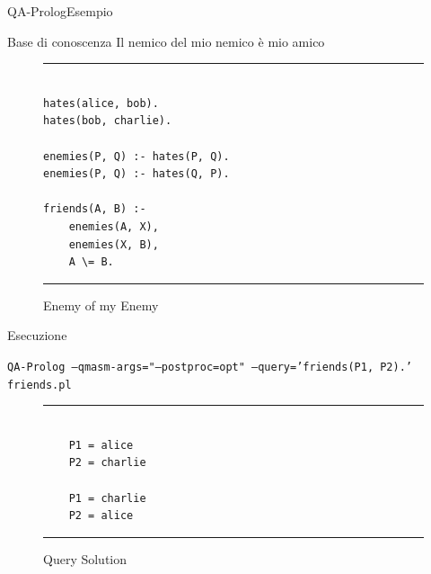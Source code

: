 \begin{frame}[fragile]{QA-Prolog}{Esempio}
	\begin{minipage}{.48\linewidth}
		\begin{block}{Base di conoscenza}
			Il nemico del mio nemico è mio amico
		\end{block}
		\begin{figure}[h]
			\begin{minipage}{\linewidth}
				\hrule
				\begin{verbatim}
					
hates(alice, bob).
hates(bob, charlie).

enemies(P, Q) :- hates(P, Q).
enemies(P, Q) :- hates(Q, P).

friends(A, B) :-
	enemies(A, X),
	enemies(X, B),
	A \= B.
				\end{verbatim}
				\hrule
			\end{minipage}
			\caption{Enemy of my Enemy}
		\end{figure}
	\end{minipage}
	\hfill
	\pause
	\begin{minipage}{.48\linewidth}
		\begin{block}{Esecuzione}
			\begin{center}
				\scriptsize \texttt{QA-Prolog --qmasm-args="--postproc=opt" --query='friends(P1, P2).' friends.pl}
			\end{center}
		\end{block}
		\begin{figure}[h]
			\begin{minipage}{.3\linewidth}
				\hrule
				\begin{verbatim}
					
	P1 = alice
	P2 = charlie
	
	P1 = charlie
	P2 = alice
				\end{verbatim}
				\hrule
			\end{minipage}
			\caption{Query Solution}
		\end{figure}
	\end{minipage}
\end{frame}